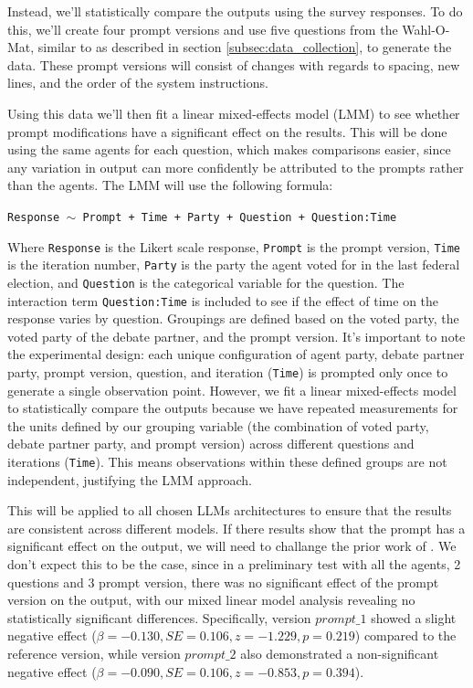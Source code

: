 \documentclass[12pt]{article}
\begin{document}
\begin{multicols}{2}
Instead, we'll statistically compare the outputs using the survey responses. To do this, we'll create four prompt versions and use five questions from the Wahl-O-Mat, similar to as described in section \ref{subsec:data_collection}, to generate the data. These prompt versions will consist of changes with regards to spacing, new lines, and the order of the system instructions. 
 
Using this data we'll then fit a linear mixed-effects model (LMM) to see whether prompt modifications have a significant effect on the results. This will be done using the same agents for each question, which makes comparisons easier, since any variation in output can more confidently be attributed to the prompts rather than the agents. The LMM will use the following formula:

\texttt{Response $\sim$ Prompt + Time + Party + Question + Question:Time}

Where \texttt{Response} is the Likert scale response, \texttt{Prompt} is the prompt version, \texttt{Time} is the iteration number, \texttt{Party} is the party the agent voted for in the last federal election, and \texttt{Question} is the categorical variable for the question. The interaction term \texttt{Question:Time} is included to see if the effect of time on the response varies by question. Groupings are defined based on the voted party, the voted party of the debate partner, and the prompt version. It's important to note the experimental design: each unique configuration of agent party, debate partner party, prompt version, question, and iteration (\texttt{Time}) is prompted only once to generate a single observation point. However, we fit a linear mixed-effects model to statistically compare the outputs because we have repeated measurements for the units defined by our grouping variable (the combination of voted party, debate partner party, and prompt version) across different questions and iterations (\texttt{Time}). This means observations within these defined groups are not independent, justifying the LMM approach.

This will be applied to all chosen LLMs architectures to ensure that the results are consistent across different models. If there results show that the prompt has a significant effect on the output, we will need to challange the prior work of . We don't expect this to be the case, since in a preliminary test with all the agents, 2 questions and 3 prompt version, there was no significant effect of the prompt version on the output, with our mixed linear model analysis revealing no statistically significant differences. Specifically, version $prompt\_1$ showed a slight negative effect ($\beta = -0.130, SE = 0.106, z = -1.229, p = 0.219$) compared to the reference version, while version $prompt\_2$ also demonstrated a non-significant negative effect ($\beta = -0.090, SE = 0.106, z = -0.853, p = 0.394$). 


\end{multicols}
\end{document}
